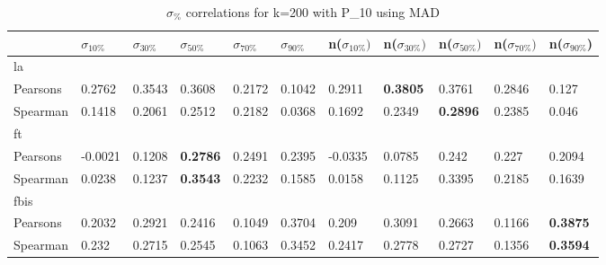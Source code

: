 \documentclass{sig-alternate}
\begin{document}
\begin{table}[h!]
\centering
\begin{tabular}{|l||l|l|l|l|l||l|l|l|l|l|}
\hline
& $\sigma_{10\%}$ & $\sigma_{30\%}$ & $\sigma_{50\%}$ & $\sigma_{70\%}$ & $\sigma_{90\%}$ & n($\sigma_{10\%})$ & n($\sigma_{30\%})$ & n($\sigma_{50\%})$ & n($\sigma_{70\%})$ & n($\sigma_{90\%}$) \\ \hline
\hline la &  &  &  &  &  &  &  &  &  &  \\ \hline
Pearsons & 0.2762 & 0.3543 & 0.3608 & 0.2172 & 0.1042 & 0.2911 & \textbf{0.3805} & 0.3761 & 0.2846 & 0.127 \\ \hline
Spearman & 0.1418 & 0.2061 & 0.2512 & 0.2182 & 0.0368 & 0.1692 & 0.2349 & \textbf{0.2896} & 0.2385 & 0.046 \\ \hline
\hline ft &  &  &  &  &  &  &  &  &  &  \\ \hline
Pearsons & -0.0021 & 0.1208 & \textbf{0.2786} & 0.2491 & 0.2395 & -0.0335 & 0.0785 & 0.242 & 0.227 & 0.2094 \\ \hline
Spearman & 0.0238 & 0.1237 & \textbf{0.3543} & 0.2232 & 0.1585 & 0.0158 & 0.1125 & 0.3395 & 0.2185 & 0.1639 \\ \hline
\hline fbis &  &  &  &  &  &  &  &  &  &  \\ \hline
Pearsons & 0.2032 & 0.2921 & 0.2416 & 0.1049 & 0.3704 & 0.209 & 0.3091 & 0.2663 & 0.1166 & \textbf{0.3875} \\ \hline
Spearman & 0.232 & 0.2715 & 0.2545 & 0.1063 & 0.3452 & 0.2417 & 0.2778 & 0.2727 & 0.1356 & \textbf{0.3594} \\ \hline
\end{tabular}
\caption{$\sigma_{\%}$ correlations for k=200 with P\_10 using MAD}
\end{table}
\end{document}

